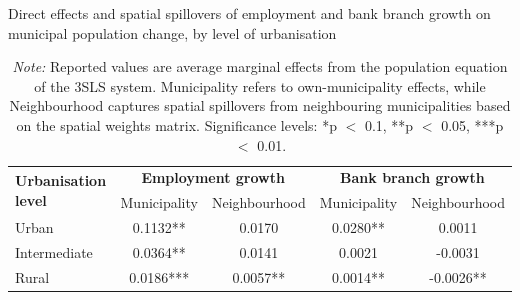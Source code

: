 \documentclass[a4paper,11pt,oneside]{article}
\begin{document}
{\begin{table}
\centering
\caption{Direct effects and spatial spillovers of employment and bank branch growth on municipal population change, by level of urbanisation}
\label{tbl:spillovers}
\vspace{-2mm}
\begin{tabular}{lcccc}
\toprule
\multirow{2}{*}{\textbf{Urbanisation level}}
& \multicolumn{2}{c}{\textbf{Employment growth}}
& \multicolumn{2}{c}{\textbf{Bank branch growth}} \\
\cmidrule(lr){2-3} \cmidrule(lr){4-5}
& Municipality & Neighbourhood
& Municipality & Neighbourhood \\
\midrule
Urban
& 0.1132**  & 0.0170
& 0.0280**  & 0.0011 \\
Intermediate
& 0.0364**  & 0.0141
& 0.0021    & -0.0031 \\
Rural
& 0.0186*** & 0.0057**
& 0.0014**  & -0.0026** \\
\bottomrule
\end{tabular}

\vspace{0.2cm}
\caption*{\footnotesize
\textsl{Note:} Reported values are average marginal effects from the population equation of the 3SLS system.
Municipality refers to own-municipality effects, while Neighbourhood captures spatial spillovers from neighbouring municipalities based on the spatial weights matrix.
Significance levels: *p $<$ 0.1, **p $<$ 0.05, ***p $<$ 0.01.}
\end{table}







}
\end{document}
